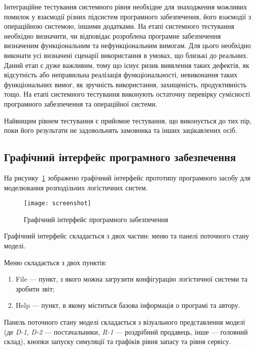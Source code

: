 Інтеграційне тестування системного рівня необхідне для знаходження можливих помилок у взаємодії різних підсистем програмного забезпечення, його взаємодії з операційною системою, іншими додатками.
На етапі системного тестування необхідно визначити, чи відповідає розроблена програмне забезпечення визначеним функціональним та нефункціональним вимогам.
Для цього необхідно виконати усі визначені сценарії використання в умовах, що близькі до реальних. 
Даний етап є дуже важливим, тому що існує ризик виявлення таких дефектів, як відсутність або неправильна реалізація функціональності, невиконання таких функціональних вимог, як зручність використання, захищеність, продуктивність тощо. 
На етапі системного тестування виконують остаточну перевірку сумісності програмного забезпечення та операційної системи.

Найвищим рівнем тестування є прийомне тестування, що виконується до тих пір, поки його результати не задовольнять замовника та інших зацікавлених осіб.

\subsection{Графічний інтерфейс програмного забезпечення}
На рисунку~\ref{fig:screenshot} зображено графічний інтерфейс прототипу програмного засобу для моделювання розподільчих логістичних систем.

\begin{figure}[H]
	\centering
	\texttt{[image: screenshot]}
	\caption{Графічний інтерфейс програмного забезпечення}
	\label{fig:screenshot}
\end{figure} 

Графічний інтерфейс складається з двох частин: меню та панелі поточного стану моделі.

Меню складається з двох пунктів:
\begin{enumerate}[label={\arabic*)}]
	\item File --- пункт, з якого можна загрузити конфігурацію логістичної системи та зробити звіт;
	\item Help --- пункт, в якому міститься базова інформація о програмі та автору.
\end{enumerate} 

Панель поточного стану моделі складається з візуального представлення моделі (де \textit{D-1}, \textit{D-2} --- постачальники, \textit{R-1} --- роздрібний продавець, інше --- головний склад), кнопки запуску симуляції та графіків рівня запасу та рівня сервісу.

